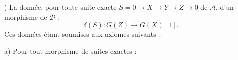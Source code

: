 ) La donnée, pour toute suite exacte
$S=0\longrightarrow X\longrightarrow Y\longrightarrow Z\longrightarrow0$
de $\mathcal A$, d'un morphisme de $\mathcal D$ :
\[
\delta(S)\colon G(Z)\longrightarrow G(X)[1].
\]
Ces données étant soumises aux axiomes suivants :

\noindent a) Pour tout morphisme de suites exactes :

\begin{center}
\end{center}
\endgroup
